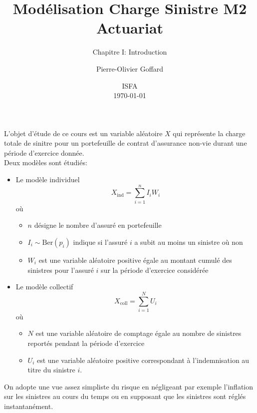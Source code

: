 \documentclass[8pt,notheorems]{beamer}
\title[]{Modélisation Charge Sinistre M2 Actuariat}
\subtitle{Chapitre I: Introduction}
\author{Pierre-Olivier Goffard}
\institute{
	   Université de Lyon 1\\
	ISFA\\
	   \texttt{pierre-olivier.goffard@univ-lyon1.fr}
	  }
\date{
ISFA\\
\today}
\theoremstyle{definition}
\theoremstyle{example}
\theoremstyle{mystyle}
\theoremstyle{plain}
\begin{document}
\frame{\titlepage}


\begin{frame}[allowframebreaks]


L'objet d'étude de ce cours est un variable aléatoire $X$ qui représente la charge totale de sinitre pour un portefeuille de contrat d'assurance non-vie durant une période d'exercice donnée.\\

Deux modèles sont étudiés:
\begin{itemize}
    \item Le modèle individuel
    $$
    X_{\text{ind}} = \sum_{i  = 1}^nI_iW_i
    $$
    où
    \begin{itemize}
        \item $n$ désigne le nombre d'assuré en portefeuille
        \item $I_i\sim \text{Ber}(p_i)$ indique si l'assuré $i$ a subit au moins un sinistre où non
        \item $W_i$ est une variable aléatoire positive égale au montant cumulé des sinistres pour l'assuré $i$ sur la période d'exercice considérée
    \end{itemize}
    \item Le modèle collectif
    $$
    X_{\text{coll}} = \sum_{i  = 1}^N U_i
    $$
    où
    \begin{itemize}
        \item $N$ est une variable aléatoire de comptage égale au nombre de sinistres reportés pendant la période d'exercice
        \item $U_i$ est une variable aléatoire positive correspondant à l'indemnisation au titre du sinistre $i$.  
    \end{itemize}
\end{itemize}

On adopte une vue assez simpliste du risque en négligeant par exemple l'inflation sur les sinistres au cours du temps ou en supposant que les sinistres sont réglés instantanément. 
\end{frame}
\end{document}
